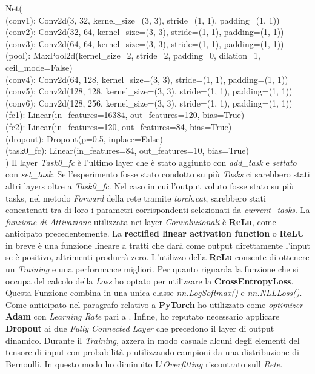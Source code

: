 \newline
Net(\\
  (conv1): Conv2d(3, 32, kernel_size=(3, 3), stride=(1, 1), padding=(1, 1))\\
  (conv2): Conv2d(32, 64, kernel_size=(3, 3), stride=(1, 1), padding=(1, 1))\\
  (conv3): Conv2d(64, 64, kernel_size=(3, 3), stride=(1, 1), padding=(1, 1))\\
  (pool): MaxPool2d(kernel_size=2, stride=2, padding=0, dilation=1, ceil_mode=False)\\
  (conv4): Conv2d(64, 128, kernel_size=(3, 3), stride=(1, 1), padding=(1, 1))\\
  (conv5): Conv2d(128, 128, kernel_size=(3, 3), stride=(1, 1), padding=(1, 1))\\
  (conv6): Conv2d(128, 256, kernel_size=(3, 3), stride=(1, 1), padding=(1, 1))\\
  (fc1): Linear(in_features=16384, out_features=120, bias=True)\\
  (fc2): Linear(in_features=120, out_features=84, bias=True)\\
  (dropout): Dropout(p=0.5, inplace=False)\\
  (task0\_fc): Linear(in_features=84, out_features=10, bias=True)\\
)
\newpage
Il layer \textit{Task0\_fc} è l'ultimo layer che è stato aggiunto con \textit{add\_task} e \textit{settato} con \textit{set\_task}.
Se l'esperimento fosse stato condotto su più \textit{Tasks} ci sarebbero stati altri layers oltre a \textit{Task0\_fc}. Nel caso in cui l'output voluto fosse stato su più tasks, nel metodo \textit{Forward} della rete tramite \textit{torch.cat}, sarebbero stati concatenati tra di loro i parametri corrispondenti selezionati da \textit{current\_tasks}.
\newline
La \textit{funzione di Attivazione} utilizzata nei layer \textit{Convoluzionali} è \textbf{ReLu}, come anticipato precedentemente.
La \textbf{rectified linear activation function} o \textbf{ReLU} in breve è una funzione lineare a tratti che darà  come output direttamente l'input se è positivo, altrimenti produrrà zero. L'utilizzo della \textbf{ReLu} consente di ottenere un \textit{Training} e una performance migliori.
\newline
Per quanto riguarda la funzione che si occupa del calcolo della \textit{Loss} ho optato per utilizzare la \textbf{CrossEntropyLoss}. Questa Funzione combina in una unica classe \textit{nn.LogSoftmax()} e \textit{ nn.NLLLoss()}.
Come anticipato nel paragrafo relativo a \textbf{PyTorch} ho utilizzato come \textit{optimizer} \textbf{Adam} con \textit{Learning Rate} pari a  .\newline
Infine, ho reputato necessario applicare \textbf{Dropout} ai due \textit{Fully Connected Layer} che precedono il layer di output dinamico. Durante il \textit{Training}, azzera in modo casuale alcuni degli elementi del tensore di input con probabilità p utilizzando campioni da una distribuzione di Bernoulli. In questo modo ho diminuito L'\textit{Overfitting}  riscontrato sull \textit{Rete}.